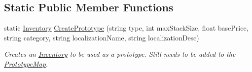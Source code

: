 \subsection*{Static Public Member Functions}
\begin{DoxyCompactItemize}
\item 
static \hyperlink{class_inventory}{Inventory} \hyperlink{class_inventory_a79ca58bbf438e53b0a83f7d10dd9e468}{Create\+Prototype} (string type, int max\+Stack\+Size, float base\+Price, string category, string localization\+Name, string localization\+Desc)
\begin{DoxyCompactList}\small\item\em Creates an \hyperlink{class_inventory}{Inventory} to be used as a prototype. Still needs to be added to the \hyperlink{class_prototype_map}{Prototype\+Map}. \end{DoxyCompactList}\end{DoxyCompactItemize}
